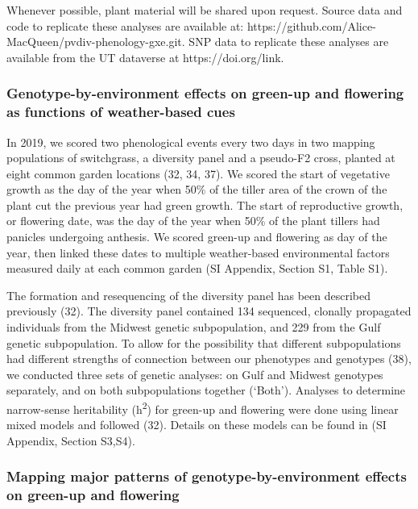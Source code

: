 \documentclass[
  9pt,
  twocolumn,
  twoside]{pnas-new}
\begin{document}
Whenever possible, plant material will be shared upon request. Source
data and code to replicate these analyses are available at:
https://github.com/Alice-MacQueen/pvdiv-phenology-gxe.git. SNP data to
replicate these analyses are available from the UT dataverse at
https://doi.org/link.

\subsubsection{Genotype-by-environment effects on green-up and flowering
as functions of weather-based
cues}\label{genotype-by-environment-effects-on-green-up-and-flowering-as-functions-of-weather-based-cues}

In 2019, we scored two phenological events every two days in two mapping
populations of switchgrass, a diversity panel and a pseudo-F2 cross,
planted at eight common garden locations (32, 34, 37). We scored the
start of vegetative growth as the day of the year when 50\% of the
tiller area of the crown of the plant cut the previous year had green
growth. The start of reproductive growth, or flowering date, was the day
of the year when 50\% of the plant tillers had panicles undergoing
anthesis. We scored green-up and flowering as day of the year, then
linked these dates to multiple weather-based environmental factors
measured daily at each common garden (SI Appendix, Section S1, Table
S1).

The formation and resequencing of the diversity panel has been described
previously (32). The diversity panel contained 134 sequenced, clonally
propagated individuals from the Midwest genetic subpopulation, and 229
from the Gulf genetic subpopulation. To allow for the possibility that
different subpopulations had different strengths of connection between
our phenotypes and genotypes (38), we conducted three sets of genetic
analyses: on Gulf and Midwest genotypes separately, and on both
subpopulations together (`Both'). Analyses to determine narrow-sense
heritability (h\textsuperscript{2}) for green-up and flowering were done
using linear mixed models and followed (32). Details on these models can
be found in (SI Appendix, Section S3,S4).

\subsubsection{Mapping major patterns of genotype-by-environment effects
on green-up and
flowering}\label{mapping-major-patterns-of-genotype-by-environment-effects-on-green-up-and-flowering}
\end{document}
